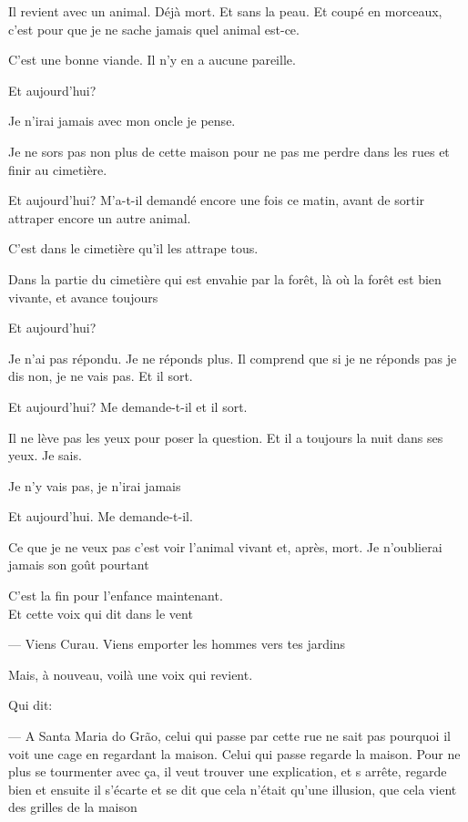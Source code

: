 Il revient avec un animal. Déjà mort. Et sans la peau. Et coupé en
morceaux, c'est pour que je ne sache jamais quel animal est-ce.

C'est une bonne viande. Il n'y en a aucune pareille.

Et aujourd'hui?

Je n'irai jamais avec mon oncle je pense.

Je ne sors pas non plus de cette maison pour ne pas me perdre dans les
rues et finir au cimetière.

Et aujourd'hui? M'a-t-il demandé encore une fois ce matin, avant de
sortir attraper encore un autre animal.

C'est dans le cimetière qu'il les attrape tous.

Dans la partie du cimetière qui est envahie par la forêt, là où la forêt
est bien vivante, et avance toujours

Et aujourd'hui?

Je n'ai pas répondu. Je ne réponds plus. Il comprend que si je ne
réponds pas je dis non, je ne vais pas. Et il sort.

Et aujourd'hui? Me demande-t-il et il sort.

Il ne lève pas les yeux pour poser la question. Et il a toujours la nuit
dans ses yeux. Je sais.

Je n'y vais pas, je n'irai jamais

Et aujourd'hui. Me demande-t-il.

Ce que je ne veux pas c'est voir l'animal vivant et, après, mort. Je
n'oublierai jamais son goût pourtant

\breakk

\vspace*{4cm}

C'est la fin pour l'enfance maintenant.\\

Et cette voix qui dit dans le vent

--- Viens Curau. Viens emporter les hommes vers tes jardins

\breakk

\vspace*{4cm}

Mais, à nouveau, voilà une voix qui revient.

Qui dit:

--- A Santa Maria do Grão, celui qui passe par cette rue ne sait pas
  pourquoi il voit une cage en regardant la maison. Celui qui passe
  regarde la maison. Pour ne plus se tourmenter avec ça, il veut trouver
  une explication, et s arrête, regarde bien et ensuite il s'écarte et
  se dit que cela n'était qu'une illusion, que cela vient des grilles de
  la maison

